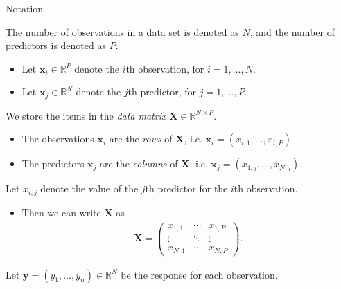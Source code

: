 \documentclass[8pt]{beamer}
\newcommand{\mys}{\vspace{0.5cm} \pause
}
\begin{document}
\begin{frame}{\color{white} Notation}

The number of observations in a data set is denoted as $N$, and the number of predictors is denoted as $P$.
\begin{itemize}
    \item Let $\bm{x}_i \in \mathbb{R}^P$ denote the $i$th observation, for $i = 1, \ldots, N$.
    \item Let $\mathbf{x}_j \in \mathbb{R}^N$ denote the $j$th predictor, for $j = 1, \ldots, P$.
\end{itemize} \mys

We store the items in the \textit{data matrix} $\mathbf{X} \in \mathbb{R}^{N \times P}$.
\begin{itemize}
    \item The observations $\bm{x}_i$ are the \textit{rows} of $\mathbf{X}$, i.e. $\bm{x}_i = (x_{i, 1}, \ldots, x_{i, P})$
    \item The predictors $\mathbf{x}_j$ are the \textit{columns} of $\mathbf{X}$, i.e. $\mathbf{x}_j = (x_{1,j}, \ldots, x_{N,j})$.
\end{itemize} \mys

Let $x_{i,j}$ denote the value of the $j$th predictor for the $i$th observation.
\begin{itemize}
    \item Then we can write $\mathbf{X}$ as 
    \begin{align*}
        \mathbf{X} = \begin{pmatrix}
        x_{1,1} & \cdots & x_{1,P} \\
        \vdots & \ddots & \vdots \\
        x_{N,1} & \cdots & x_{N,P}
        \end{pmatrix}.
    \end{align*}
\end{itemize} \mys

Let $\mathbf{y} = (y_1, \ldots, y_n) \in \mathbb{R}^N$ be the response for each observation.
    
\end{frame}
\end{document}

